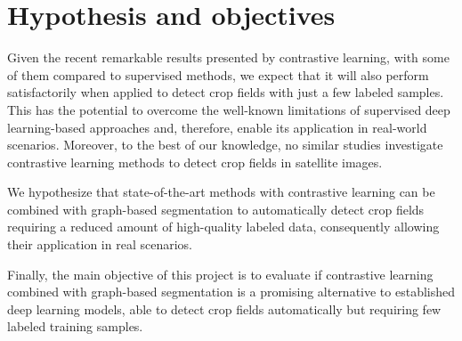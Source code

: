 \documentclass[12pt]{article}
\begin{document}

% 

\section{Hypothesis and objectives}\label{section:objetivos}

Given the recent remarkable results presented by contrastive learning, with some of them compared to supervised methods, we expect that it will also perform satisfactorily when applied to detect crop fields with just a few labeled samples. This has the potential to overcome the well-known limitations of supervised deep learning-based approaches and, therefore, enable its application in real-world scenarios. Moreover, to the best of our knowledge, no similar studies investigate contrastive learning methods to detect crop fields in satellite images.

We hypothesize that state-of-the-art methods with contrastive learning can be combined with graph-based segmentation to automatically detect crop fields requiring a reduced amount of high-quality labeled data, consequently allowing their application in real scenarios.

Finally, the main objective of this project is to evaluate if contrastive learning combined with graph-based segmentation is a promising alternative to established deep learning models, able to detect crop fields automatically but requiring few labeled training samples. 
\end{document}
